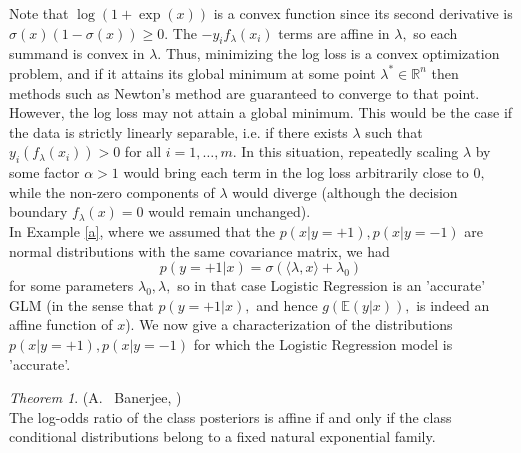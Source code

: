 \documentclass[BSc]{usydthesis}
\numberwithin{equation}{chapter}
\theoremstyle{remark}
\newtheorem{Theorem}[equation]{Theorem}
\newcommand{\la}{\lambda}
\begin{document}
Note that $\log(1+\exp(x))$ is a convex function since its second derivative is $\sigma(x)(1-\sigma(x)) \geq 0.$ The $-y_i f_{\la}(x_i)$ terms are affine in $\la,$ so each summand is convex in $\la.$ Thus, minimizing the log loss is a convex optimization problem, and if it attains its global minimum at some point $\la^* \in \mathbb{R}^n$ then methods such as Newton's method are guaranteed to converge to that point. However, the log loss may not attain a global minimum. This would be the case if the data is strictly linearly separable, i.e. if there exists $\la$ such that $y_i (f_{\la}(x_i)) > 0$ for all $i=1,\ldots, m.$ In this situation, repeatedly scaling $\la$ by some factor $\alpha > 1$ would bring each term in the log loss arbitrarily close to $0,$ while the non-zero components of $\la$ would diverge (although the decision boundary $f_{\la}(x)=0$ would remain unchanged). \\

In Example \ref{a}, where we assumed that the $p(x|y=+1), p(x|y=-1)$ are normal distributions with the same covariance matrix, we had $$ p(y=+1|x) = \sigma( \langle \la, x \rangle + \la_0)$$ for some parameters $\la_0, \la,$ so in that case Logistic Regression is an 'accurate' GLM (in the sense that $p(y=+1|x),$ and hence $g(\mathbb{E}(y|x)),$ is indeed an affine function of $x$). We now give a characterization of the distributions $p(x|y=+1), p(x|y=-1)$ for which the Logistic Regression model is 'accurate'.

\begin{Theorem} (A.~ Banerjee, \cite{logodds})\\
 The log-odds ratio of the class posteriors is affine if and only if the class conditional distributions belong to a fixed natural exponential family. 
\end{Theorem}
\end{document}
